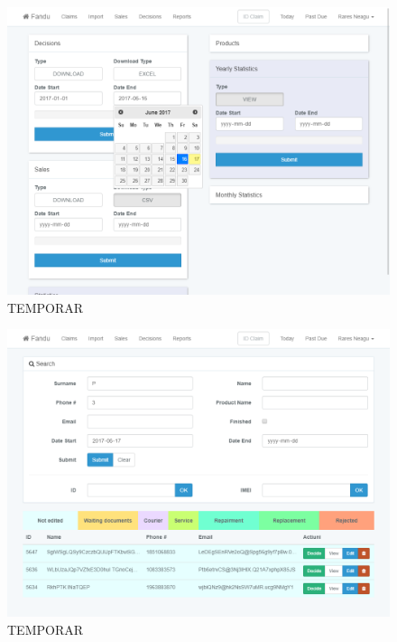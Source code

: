 	\begin{figure}
		\includegraphics[width=\linewidth]{../imagini/claims_reports.png}
		\caption{TEMPORAR}
		\label{fig:TEMP}
	\end{figure}
	\begin{figure}
		\includegraphics[width=\linewidth]{../imagini/claims_search.png}
		\caption{TEMPORAR}
		\label{fig:TEMP}
	\end{figure}
